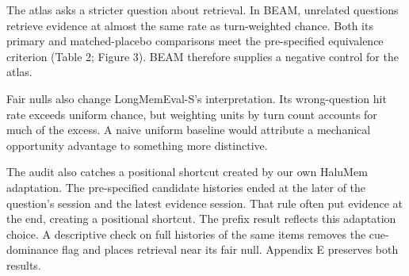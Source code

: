 \documentclass[11pt]{article}
\begin{document}
The atlas asks a stricter question about retrieval. In BEAM, unrelated questions retrieve evidence at almost the same rate as turn-weighted chance. Both its primary and matched-placebo comparisons meet the pre-specified equivalence criterion (Table 2; Figure 3). BEAM therefore supplies a negative control for the atlas.

Fair nulls also change LongMemEval-S's interpretation. Its wrong-question hit rate exceeds uniform chance, but weighting units by turn count accounts for much of the excess. A naive uniform baseline would attribute a mechanical opportunity advantage to something more distinctive.

The audit also catches a positional shortcut created by our own HaluMem adaptation. The pre-specified candidate histories ended at the later of the question's session and the latest evidence session. That rule often put evidence at the end, creating a positional shortcut. The prefix result reflects this adaptation choice. A descriptive check on full histories of the same items removes the cue-dominance flag and places retrieval near its fair null. Appendix E preserves both results.
\end{document}
